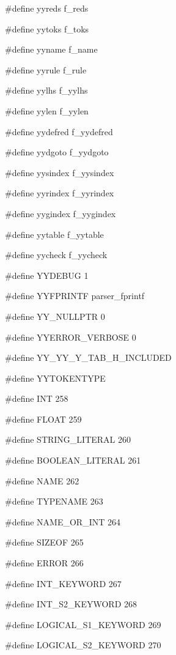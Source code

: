 \medskip
{\stt \#define yyreds f\_reds}

\medskip
{\stt \#define yytoks f\_toks}

\medskip
{\stt \#define yyname f\_name}

\medskip
{\stt \#define yyrule f\_rule}

\medskip
{\stt \#define yylhs f\_yylhs}

\medskip
{\stt \#define yylen f\_yylen}

\medskip
{\stt \#define yydefred f\_yydefred}

\medskip
{\stt \#define yydgoto f\_yydgoto}

\medskip
{\stt \#define yysindex f\_yysindex}

\medskip
{\stt \#define yyrindex f\_yyrindex}

\medskip
{\stt \#define yygindex f\_yygindex}

\medskip
{\stt \#define yytable f\_yytable}

\medskip
{\stt \#define yycheck f\_yycheck}

\medskip
{\stt \#define YYDEBUG 1}

\medskip
{\stt \#define YYFPRINTF parser\_fprintf}

\medskip
{\stt \#define YY\_NULLPTR 0}

\medskip
{\stt \#define YYERROR\_VERBOSE 0}

\medskip
{\stt \#define YY\_YY\_Y\_TAB\_H\_INCLUDED}

\medskip
{\stt \#define YYTOKENTYPE}

\medskip
{\stt \#define INT 258}

\medskip
{\stt \#define FLOAT 259}

\medskip
{\stt \#define STRING\_LITERAL 260}

\medskip
{\stt \#define BOOLEAN\_LITERAL 261}

\medskip
{\stt \#define NAME 262}

\medskip
{\stt \#define TYPENAME 263}

\medskip
{\stt \#define NAME\_OR\_INT 264}

\medskip
{\stt \#define SIZEOF 265}

\medskip
{\stt \#define ERROR 266}

\medskip
{\stt \#define INT\_KEYWORD 267}

\medskip
{\stt \#define INT\_S2\_KEYWORD 268}

\medskip
{\stt \#define LOGICAL\_S1\_KEYWORD 269}

\medskip
{\stt \#define LOGICAL\_S2\_KEYWORD 270}

